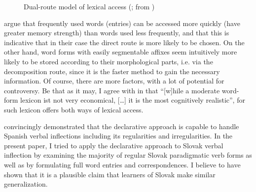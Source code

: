 \documentclass[output=paper,colorlinks,citecolor=brown,
]{langscibook}
\begin{document}
\begin{figure}
\centering
{}
\caption{Dual-route model of lexical access (\citealt[1045]{Hay2001}; from \citealt[72]{HaspelmathSims2010})}
\label{fig:LexicalAccess}
\end{figure} 

\citet[73]{HaspelmathSims2010} argue that frequently used words (entries) can be accessed more quickly (have greater memory strength) than words used less frequently, and that this is indicative that in their case the direct route is more likely to be chosen. On the other hand, word forms with easily segmentable affixes seem intuitively more likely to be stored according to their morphological parts, i.e. via the decomposition route, since it is the faster method to gain the necessary information. Of course, there are more factors, with a lot of potential for controversy. Be that as it may, I agree with \citet[74]{HaspelmathSims2010} in that ``[w]hile a moderate word-form lexicon ist not very economical, [\dots] it is the most cognitively realistic'', for such lexicon offers both ways of lexical access.

\citet{Zimmermann2019} convincingly demonstrated that the declarative approach is capable to handle Spanish verbal inflections including its regularities and irregularities. In the present paper, I tried to apply the declarative approach to Slovak verbal inflection by examining the majority of regular Slovak paradigmatic verb forms as well as by formulating full word entries and correspondences. I believe to have shown that it is a plausible claim that learners of Slovak make similar generalization. 
\end{document}
